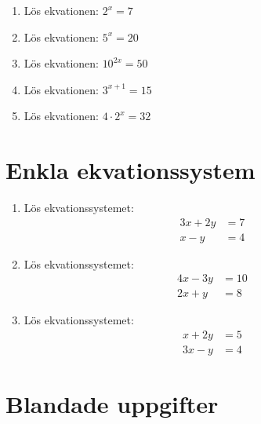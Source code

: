 \documentclass[a4paper,11pt]{article}
\begin{document}
\begin{enumerate}[label=\textbf{\arabic*.}]
    \item Lös ekvationen: $2^x = 7$
    
    \item Lös ekvationen: $5^x = 20$
    
    \item Lös ekvationen: $10^{2x} = 50$
    
    \item Lös ekvationen: $3^{x+1} = 15$
    
    \item Lös ekvationen: $4 \cdot 2^x = 32$
\end{enumerate}

\section{Enkla ekvationssystem}

\begin{enumerate}[label=\textbf{\arabic*.}]  
    \item Lös ekvationssystemet:
    \begin{align*}
    3x + 2y &= 7\\
    x - y &= 4
    \end{align*}
    
    \item Lös ekvationssystemet:
    \begin{align*}
    4x - 3y &= 10\\
    2x + y &= 8
    \end{align*}
    
    \item Lös ekvationssystemet:
    \begin{align*}
    x + 2y &= 5\\
    3x - y &= 4
    \end{align*}
\end{enumerate}

\section{Blandade uppgifter}
\end{document}
